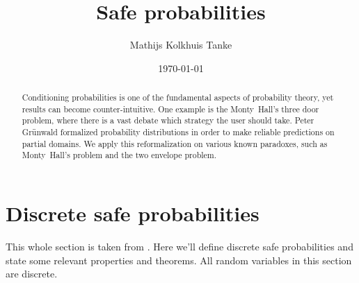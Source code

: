 \documentclass[twoside,a4paper]{article}
\title{Safe probabilities}
\author{Mathijs Kolkhuis Tanke}
\date{\today}
\theoremstyle{plain}
\theoremstyle{definition}
\theoremstyle{remark}
\numberwithin{equation}{section}
\DeclareMathOperator{\1}{\mathbbm{1}}
\begin{document}
\maketitle

\begin{abstract}
Conditioning probabilities is one of the fundamental aspects of probability theory, yet results can become counter-intuitive. One example is the Monty~Hall's three door problem, where there is a vast debate which strategy the user should take. Peter Grünwald \cite{Grunwald16} formalized probability distributions in order to make reliable predictions on partial domains. We apply this reformalization on various known paradoxes, such as Monty~Hall's problem and the two envelope problem.
\end{abstract}

\tableofcontents


\section{Discrete safe probabilities}
This whole section is taken from \cite{Grunwald16}. Here we'll define discrete safe probabilities and state some relevant properties and theorems. All random variables in this section are discrete.
\end{document}
